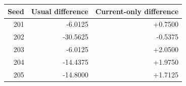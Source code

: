 \begin{tabular}{rrr}
\toprule
Seed & Usual difference & Current-only difference\\
\midrule
201 & -6.0125 & +0.7500\\
202 & -30.5625 & -0.5375\\
203 & -6.0125 & +2.0500\\
204 & -14.4375 & +1.9750\\
205 & -14.8000 & +1.7125\\
\bottomrule
\end{tabular}

